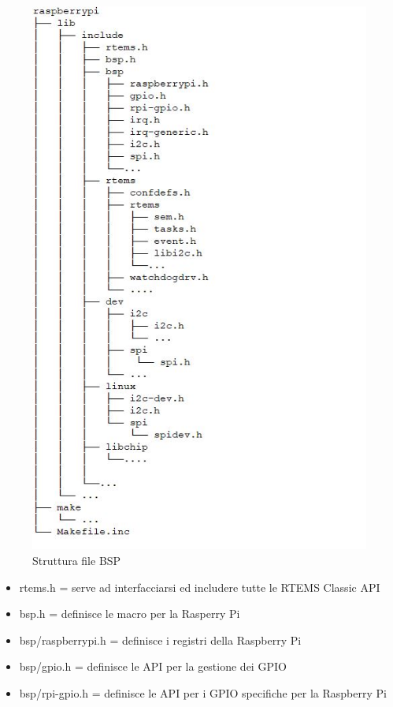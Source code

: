 \documentclass[12pt, a4paper, titlepage, oneside]{book}
\begin{document}
\begin{flushleft}
\begin{figure} [h]
    \includegraphics[scale = 1.0] {BSP_DIR_TREE.JPG}
    \caption{Struttura file BSP}
    \label{fig:Struttura cartelle BSP}
\end{figure}
\newpage
\begin{itemize}
    \item rtems.h = serve ad interfacciarsi ed includere tutte le RTEMS Classic API
    \item bsp.h = definisce le macro per la Rasperry Pi
    \item bsp/raspberrypi.h = definisce i registri della Raspberry Pi
    \item bsp/gpio.h = definisce le API per la gestione dei GPIO
    \item bsp/rpi-gpio.h = definisce le API per i GPIO specifiche per la Raspberry Pi

\end{itemize}
\end{flushleft}
\end{document}

